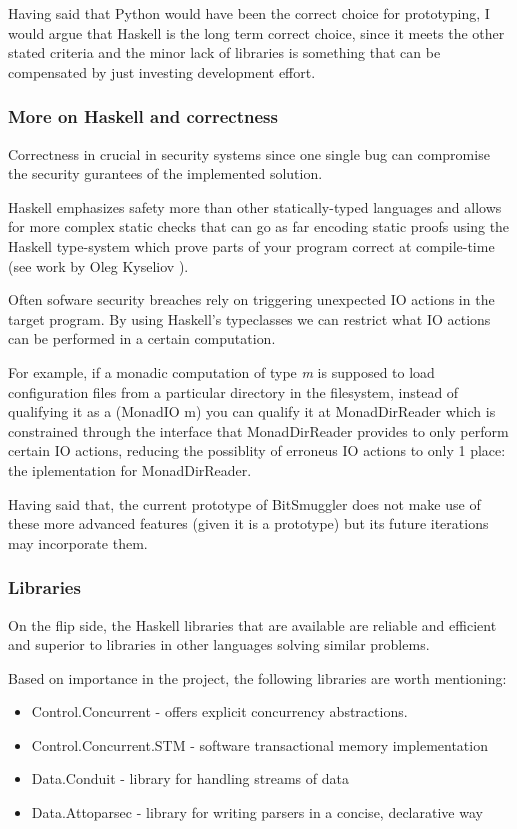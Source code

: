 \documentclass[11pt]{book} %
\newcommand{\projectName}{BitSmuggler }
\begin{document}
Having said that Python would have been the correct choice for prototyping, I would argue that Haskell is the long term correct choice, since it meets the other stated criteria and the minor lack of libraries is something that can be compensated by just investing development effort.

\subsubsection{More on Haskell and correctness}

Correctness in crucial in security systems since one single bug can compromise the security gurantees of the implemented solution.

Haskell emphasizes safety more than other statically-typed languages and allows for more complex static checks that can go as far encoding static proofs using the Haskell type-system which prove parts of your program correct at compile-time (see work by Oleg Kyseliov \citep*{olegArrays}).

Often sofware security breaches rely on triggering unexpected IO actions in the target program. By using Haskell's typeclasses we can restrict what IO actions can be performed in a certain computation.

For example, if a monadic computation of type \textit{m} is supposed to load configuration files from a particular directory in the filesystem, instead of qualifying it as a (MonadIO m) you can qualify it at MonadDirReader which is constrained through the interface that MonadDirReader provides to only perform certain IO actions, reducing the possiblity of erroneus IO actions to only 1 place: the iplementation for MonadDirReader.

Having said that, the current prototype of \projectName does not make use of these more advanced features (given it is a prototype) but its future iterations may incorporate them.

\subsubsection{Libraries}

On the flip side, the Haskell libraries that are available are reliable and efficient and superior to libraries in other languages solving similar problems.

Based on importance in the project, the following libraries are worth mentioning:

\begin{itemize}
\item  Control.Concurrent - offers explicit concurrency abstractions. 
\item Control.Concurrent.STM - software transactional memory implementation
\item Data.Conduit -  library for handling streams of data
\item Data.Attoparsec - library for writing parsers in a concise, declarative way
\end{itemize}
\end{document}
